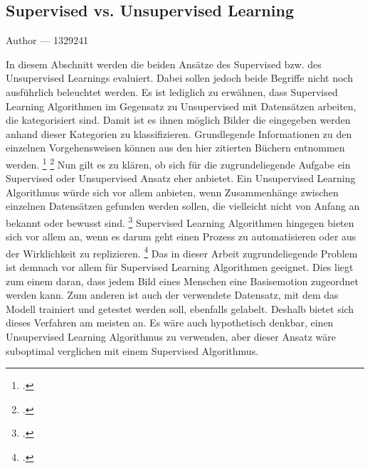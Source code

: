 \documentclass[12pt, a4paper]{report}
\makeatletter
\newcommand{\sectionauthor}[1]{%
  {\parindent0pt\vspace*{-5pt}%
  \large{Author --- }
  \linespread{1.1}\large\scshape#1%
  \par\nobreak\vspace*{35pt} }
  \@afterheading%
}
\makeatother
\begin{document}
\subsection{Supervised vs. Unsupervised Learning}
\sectionauthor{1329241}
In diesem Abschnitt werden die beiden Ansätze des Supervised bzw. des Unsupervised Learnings evaluiert. Dabei sollen jedoch beide Begriffe nicht noch ausführlich beleuchtet werden. Es ist lediglich zu erwähnen, dass Supervised Learning Algorithmen im Gegensatz zu Unsupervised mit Datensätzen arbeiten, die kategorisiert sind. Damit ist es ihnen möglich Bilder die eingegeben werden anhand dieser Kategorien zu klassifizieren. Grundlegende Informationen zu den einzelnen Vorgehensweisen können aus den hier zitierten Büchern entnommen werden.  
\footcite[Vgl. ][]{Supervised}
\footcite[Vgl. ][]{Unsupervised}
Nun gilt es zu klären, ob sich für die zugrundeliegende Aufgabe ein Supervised oder Unsupervised Ansatz eher anbietet. Ein Unsupervised Learning Algorithmus würde sich vor allem anbieten, wenn Zusammenhänge zwischen einzelnen Datensätzen gefunden werden sollen, die vielleicht nicht von Anfang an bekannt oder bewusst sind.
\footcite[Vgl. ][21]{Unsupervised}
Supervised Learning Algorithmen hingegen bieten sich vor allem an, wenn es darum geht einen Prozess zu automatisieren oder aus der Wirklichkeit zu replizieren.
\footcite[Vgl. ][4]{Supervised}
Das in dieser Arbeit zugrundeliegende Problem ist demnach vor allem für Supervised Learning Algorithmen geeignet. Dies liegt zum einem daran, dass jedem Bild eines Menschen eine Basisemotion zugeordnet werden kann. Zum anderen ist auch der verwendete Datensatz, mit dem das Modell trainiert und getestet werden soll, ebenfalls gelabelt. Deshalb bietet sich dieses Verfahren am meisten an. Es wäre auch hypothetisch denkbar, einen Unsupervised Learning Algorithmus zu verwenden, aber dieser Ansatz wäre suboptimal verglichen mit einem Supervised Algorithmus.
\end{document}
